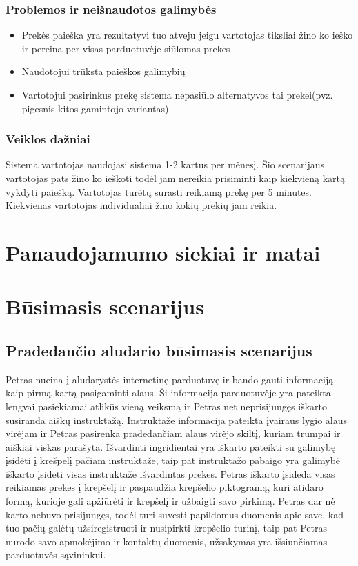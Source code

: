 \documentclass[oneside]{VUMIFPSkursinis}
\begin{document}
	\subsubsection{Problemos ir neišnaudotos galimybės}
		\begin{itemize}
			\item{Prekės paieška yra rezultatyvi tuo atveju jeigu vartotojas tiksliai žino ko ieško ir pereina per visas parduotuvėje siūlomas prekes}
			\item{Naudotojui trūksta paieškos galimybių}
			\item{Vartotojui pasirinkus prekę sistema nepasiūlo alternatyvos tai prekei(pvz. pigesnis kitos gamintojo variantas)}
		\end{itemize}
	\subsubsection{Veiklos dažniai}
		Sistema vartotojas naudojasi sistema 1-2 kartus per mėnesį.
		Šio scenarijaus vartotojas pats žino ko ieškoti todėl jam nereikia prisiminti kaip kiekvieną kartą vykdyti paiešką.
		Vartotojas turėtų surasti reikiamą prekę per 5 minutes.
		Kiekvienas vartotojas individualiai žino kokių prekių jam reikia.

\section{Panaudojamumo siekiai ir matai}

\section{Būsimasis scenarijus}
	\subsection{Pradedančio aludario būsimasis scenarijus}
		Petras nueina į aludarystės internetinę parduotuvę ir bando gauti informaciją kaip pirmą kartą pasigaminti alaus.
		Ši informacija parduotuvėje yra pateikta lengvai pasiekiamai atlikūs vieną veiksmą ir Petras net neprisijungęs iškarto susiranda aiškų instruktažą.
		Instruktaže informacija pateikta įvairaus lygio alaus virėjam ir Petras pasirenka pradedančiam alaus virėjo skiltį, kuriam trumpai ir aiškiai viskas parašyta.
		Išvardinti ingridientai yra iškarto pateikti su galimybę įsidėti į krešpelį pačiam instruktaže, taip pat instruktažo pabaigo yra galimybė iškarto įsidėti visas instruktaže išvardintas prekes.
		Petras iškarto įsideda visas reikiamas prekes į krepšelį ir paspaudžia krepšelio piktogramą, kuri atidaro formą, kurioje gali apžiūrėti ir krepšelį ir užbaigti savo pirkimą.
		Petras dar nė karto nebuvo prisijungęs, todėl turi suvesti papildomus duomenis apie save, kad tuo pačių galėtų užsiregistruoti ir nusipirkti krepšelio turinį, taip pat Petras nurodo savo apmokėjimo ir kontaktų duomenis, užsakymas yra išsiunčiamas parduotuvės sąvininkui.
\end{document}
